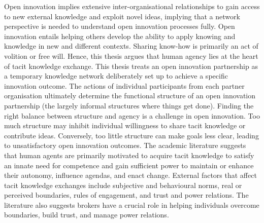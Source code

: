 \documentclass[12pt,table,xcdraw]{book}
\begin{document}
Open innovation implies extensive inter-organisational relationships to gain access to new external knowledge and exploit novel ideas, implying that a network perspective is needed to understand open innovation processes fully. Open innovation entails helping others develop the ability to apply knowing and knowledge in new and different contexts. Sharing know-how is primarily an act of volition or free will. Hence, this thesis argues that human agency lies at the heart of tacit knowledge exchange. This thesis treats an open innovation partnership as a temporary knowledge network deliberately set up to achieve a specific innovation outcome. The actions of individual participants from each partner organisation ultimately determine the functional structure of an open innovation partnership (the largely informal structures where things get done). Finding the right balance between structure and agency is a challenge in open innovation. Too much structure may inhibit individual willingness to share tacit knowledge or contribute ideas. Conversely, too little structure can make goals less clear, leading to unsatisfactory open innovation outcomes. The academic literature suggests that human agents are primarily motivated to acquire tacit knowledge to satisfy an innate need for competence and gain sufficient power to maintain or enhance their autonomy, influence agendas, and enact change. External factors that affect tacit knowledge exchanges include subjective and behavioural norms, real or perceived boundaries, rules of engagement, and trust and power relations. The literature also suggests brokers have a crucial role in helping individuals overcome boundaries, build trust, and manage power relations. \medskip
\end{document}
